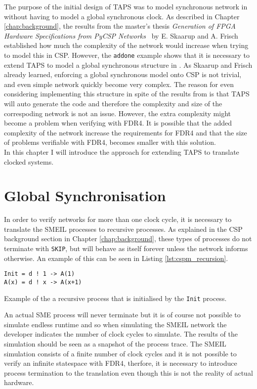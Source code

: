 The purpose of the initial design of TAPS was to model synchronous network in \cspm{} without having to model a global synchronous clock. As described in Chapter \ref{chap:background}, the results from the master's thesis \textit{Generation of FPGA Hardware
Specifications from PyCSP Networks}~\cite{Skaarup14} by E. Skaarup and A. Frisch established how much the complexity of the network would increase when trying to model this in CSP.
However, the \texttt{addone} example shows that it is necessary to extend TAPS to model a global synchronous structure in \cspm{}. As Skaarup and Frisch already learned, enforcing a global synchronous model onto CSP is not trivial, and even simple network quickly become very complex. The reason for even considering implementing this structure in spite of the results from \cite{Skaarup14} is that TAPS will auto generate the \cspm{} code and therefore the complexity and size of the correspoding \cspm{} network is not an issue. However, the extra complexity might become a problem when verifying with FDR4. It is possible that the added complexity of the network increase the requirements for FDR4 and that the size of problems verifiable with FDR4, becomes smaller with this solution. \\

In this chapter I will introduce the approach for extending TAPS to translate clocked systems.
\section{Global Synchronisation}
In order to verify networks for more than one clock cycle, it is necessary to translate the SMEIL processes to recursive \cspm{} processes. As explained in the CSP background section in Chapter \ref{chap:background}, these types of processes do not terminate with \texttt{SKIP}, but will behave as itself forever unless the network informs otherwise.
An example of this can be seen in Listing \ref{lst:cspm_recursion}.
\begin{listing}
\begin{verbatim}
Init = d ! 1 -> A(1)
A(x) = d ! x -> A(x+1)
\end{verbatim}
\caption{Example of the a recursive \cspm{} process that is initialised by the \texttt{Init} process.}
\label{lst:cspm_recursion}
\end{listing}

An actual SME process will never terminate but it is of course not possible to simulate endless runtime and so when simulating the SMEIL network the developer indicates the number of clock cycles to simulate. The results of the simulation should be seen as a snapshot of the process trace. The SMEIL simulation consists of a finite number of clock cycles and it is not possible to verify an infinite statespace with FDR4, therfore, it is necessary to introduce process termination to the translation even though this is not the reality of actual hardware. \\

